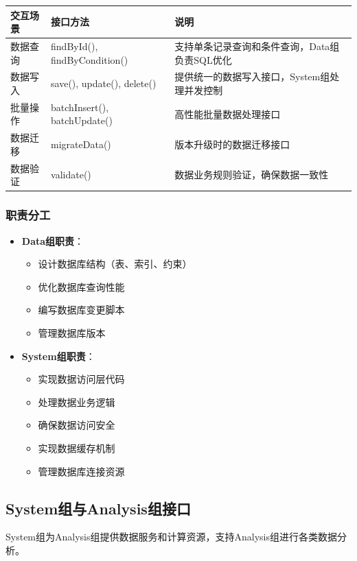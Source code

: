 \documentclass[a4paper,12pt]{article}
\begin{document}
\begin{longtable}{|p{3cm}|p{4cm}|p{8cm}|}
\hline
\textbf{交互场景} & \textbf{接口方法} & \textbf{说明} \\
\hline
\endhead
数据查询 & findById(), findByCondition() & 支持单条记录查询和条件查询，Data组负责SQL优化 \\
\hline
数据写入 & save(), update(), delete() & 提供统一的数据写入接口，System组处理并发控制 \\
\hline
批量操作 & batchInsert(), batchUpdate() & 高性能批量数据处理接口 \\
\hline
数据迁移 & migrateData() & 版本升级时的数据迁移接口 \\
\hline
数据验证 & validate() & 数据业务规则验证，确保数据一致性 \\
\hline
\end{longtable}

\subsubsection{职责分工}

\begin{itemize}
  \item \textbf{Data组职责}：
  \begin{itemize}
    \item 设计数据库结构（表、索引、约束）
    \item 优化数据库查询性能
    \item 编写数据库变更脚本
    \item 管理数据库版本
  \end{itemize}
  
  \item \textbf{System组职责}：
  \begin{itemize}
    \item 实现数据访问层代码
    \item 处理数据业务逻辑
    \item 确保数据访问安全
    \item 实现数据缓存机制
    \item 管理数据库连接资源
  \end{itemize}
\end{itemize}

\subsection{System组与Analysis组接口}

System组为Analysis组提供数据服务和计算资源，支持Analysis组进行各类数据分析。
\end{document}
